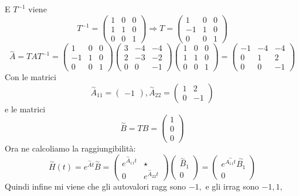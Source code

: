 \documentclass{article}
\begin{document}
E $T^{-1}$ viene \[ T^{-1} = \left(\begin{matrix}1 & 0 & 0\\1 & 1 & 0\\0 & 0 & 1\end{matrix}\right) \Longrightarrow T = \left(\begin{matrix}1 & 0 & 0\\-1 & 1 & 0\\0 & 0 & 1\end{matrix}\right) \]
\[ \overset{\sim}{A} = T A  T^{-1} = \left(\begin{matrix}1 & 0 & 0\\-1 & 1 & 0\\0 & 0 & 1\end{matrix}\right)\left(\begin{matrix}3 & -4 & -4\\2 & -3 & -2\\0 & 0 & -1\end{matrix}\right)\left(\begin{matrix}1 & 0 & 0\\1 & 1 & 0\\0 & 0 & 1\end{matrix}\right) = \left(\begin{matrix}-1 & -4 & -4\\0 & 1 & 2\\0 & 0 & -1\end{matrix}\right) \]Con le matrici \[ \overset{\sim}{A}_{11} = \left(\begin{matrix}-1\end{matrix}\right) , \overset{\sim}{A}_{22} = \left(\begin{matrix}1 & 2\\0 & -1\end{matrix}\right)  \]e le matrici \[ \overset{\sim}{B} = TB = \left(\begin{matrix}1\\0\\0\end{matrix}\right)  \]
Ora ne calcoliamo la raggiungibilità: \[ \overset{\sim}{H}(t) = e^{\overset{\sim}{A}t}\overset{\sim}{B} = \begin{pmatrix} e^{\overset{\sim}{A}_{11}t} &  \star \\ 0 & e^{\overset{\sim}{A}_{22}t} \end{pmatrix} \begin{pmatrix} \overset{\sim}{B}_1 \\ 0 \end{pmatrix} = \begin{pmatrix} e^{\overset{\sim}{A_{11}t}}\overset{\sim}{B_1} \\ 0 \end{pmatrix} \]
Quindi infine mi viene che gli autovalori ragg sono $ -1,  $ e gli irrag sono $ -1, 1,  $
\end{document}

